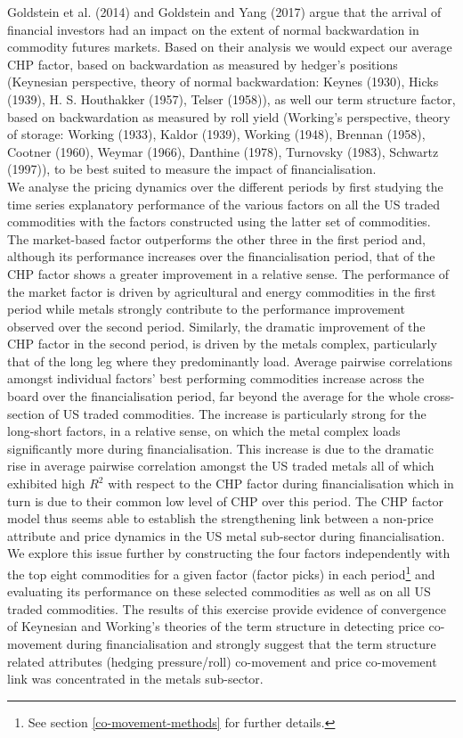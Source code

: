 \documentclass[]{elsarticle} %
\begin{document}
Goldstein et al. (2014) and Goldstein and Yang (2017) argue that the arrival of financial investors had an impact on the extent of normal backwardation in commodity futures markets. Based on their analysis we would expect our average CHP factor, based on backwardation as measured by hedger's positions (Keynesian perspective, theory of normal backwardation: Keynes (1930), Hicks (1939), H. S. Houthakker (1957), Telser (1958)), as well our term structure factor, based on backwardation as measured by roll yield (Working's perspective, theory of storage: Working (1933), Kaldor (1939), Working (1948), Brennan (1958), Cootner (1960), Weymar (1966), Danthine (1978), Turnovsky (1983), Schwartz (1997)), to be best suited to measure the impact of financialisation.\\
We analyse the pricing dynamics over the different periods by first studying the time series explanatory performance of the various factors on all the US traded commodities with the factors constructed using the latter set of commodities. The market-based factor outperforms the other three in the first period and, although its performance increases over the financialisation period, that of the CHP factor shows a greater improvement in a relative sense. The performance of the market factor is driven by agricultural and energy commodities in the first period while metals strongly contribute to the performance improvement observed over the second period. Similarly, the dramatic improvement of the CHP factor in the second period, is driven by the metals complex, particularly that of the long leg where they predominantly load. Average pairwise correlations amongst individual factors' best performing commodities increase across the board over the financialisation period, far beyond the average for the whole cross-section of US traded commodities. The increase is particularly strong for the long-short factors, in a relative sense, on which the metal complex loads significantly more during financialisation. This increase is due to the dramatic rise in average pairwise correlation amongst the US traded metals all of which exhibited high \(R^{2}\) with respect to the CHP factor during financialisation which in turn is due to their common low level of CHP over this period. The CHP factor model thus seems able to establish the strengthening link between a non-price attribute and price dynamics in the US metal sub-sector during financialisation.\\
We explore this issue further by constructing the four factors independently with the top eight commodities for a given factor (factor picks) in each period\footnote{See section \ref{co-movement-methods} for further details.} and evaluating its performance on these selected commodities as well as on all US traded commodities. The results of this exercise provide evidence of convergence of Keynesian and Working's theories of the term structure in detecting price co-movement during financialisation and strongly suggest that the term structure related attributes (hedging pressure/roll) co-movement and price co-movement link was concentrated in the metals sub-sector.\\
\end{document}
